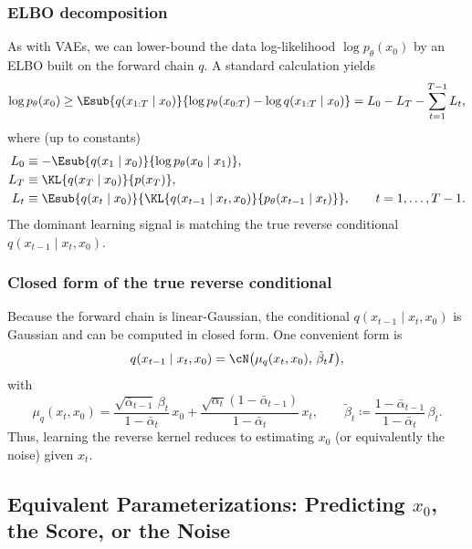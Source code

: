 \subsubsection*{ELBO decomposition}

As with VAEs, we can lower-bound the data log-likelihood $\log p_\theta(x_0)$ by an ELBO built on the forward chain $q$.
A standard calculation yields
\begin{equation}
\label{eq:diffusion-elbo}
\log p_\theta(x_0)
\ge
\Esub{q(x_{1:T}\mid x_0)}{\log p_\theta(x_{0:T}) - \log q(x_{1:T}\mid x_0)}
= L_0 - L_T - \sum_{t=1}^{T-1} L_t,
\end{equation}
where (up to constants)
\begin{align}
    L_0 &\equiv -\Esub{q(x_1\mid x_0)}{\log p_\theta(x_0\mid x_1)},\\
    L_T &\equiv \KL{q(x_T\mid x_0)}{p(x_T)},\\
    L_t &\equiv \Esub{q(x_t\mid x_0)}{\KL{q(x_{t-1}\mid x_t,x_0)}{p_\theta(x_{t-1}\mid x_t)}},\qquad t=1,\dots,T-1.
\end{align}
The dominant learning signal is matching the true reverse conditional $q(x_{t-1}\mid x_t,x_0)$.

\subsubsection*{Closed form of the true reverse conditional}

Because the forward chain is linear-Gaussian, the conditional $q(x_{t-1}\mid x_t,x_0)$ is Gaussian and can be computed in closed form.
One convenient form is
\begin{equation}
\label{eq:true-reverse}
q(x_{t-1}\mid x_t,x_0)
=\cN\bigl(\mu_q(x_t,x_0),\,\tilde\beta_t I\bigr),
\end{equation}
with
\begin{equation}
\mu_q(x_t,x_0)=
\frac{\sqrt{\bar\alpha_{t-1}}\,\beta_t}{1-\bar\alpha_t}\,x_0
+\frac{\sqrt{\alpha_t}(1-\bar\alpha_{t-1})}{1-\bar\alpha_t}\,x_t,
\qquad
\tilde\beta_t\coloneqq \frac{1-\bar\alpha_{t-1}}{1-\bar\alpha_t}\,\beta_t.
\end{equation}
Thus, learning the reverse kernel reduces to estimating $x_0$ (or equivalently the noise) given $x_t$.

\subsection{Equivalent Parameterizations: Predicting \texorpdfstring{$x_0$}{x0}, the Score, or the Noise}
\label{sec:diffusion-parameterizations}

